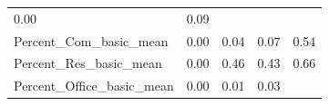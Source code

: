 \documentclass[]{article}
\begin{document}
\begin{longtable}[]{@{}lllll@{}}
\begin{minipage}[t]{0.09\columnwidth}
0.00\strut
\end{minipage} & \begin{minipage}[t]{0.11\columnwidth}\raggedright\strut
0.09\strut
\end{minipage}\tabularnewline
\begin{minipage}[t]{0.49\columnwidth}\raggedright\strut
Percent\_Com\_basic\_mean\strut
\end{minipage} & \begin{minipage}[t]{0.08\columnwidth}\raggedright\strut
0.00\strut
\end{minipage} & \begin{minipage}[t]{0.09\columnwidth}\raggedright\strut
0.04\strut
\end{minipage} & \begin{minipage}[t]{0.09\columnwidth}\raggedright\strut
0.07\strut
\end{minipage} & \begin{minipage}[t]{0.11\columnwidth}\raggedright\strut
0.54\strut
\end{minipage}\tabularnewline
\begin{minipage}[t]{0.49\columnwidth}\raggedright\strut
Percent\_Res\_basic\_mean\strut
\end{minipage} & \begin{minipage}[t]{0.08\columnwidth}\raggedright\strut
0.00\strut
\end{minipage} & \begin{minipage}[t]{0.09\columnwidth}\raggedright\strut
0.46\strut
\end{minipage} & \begin{minipage}[t]{0.09\columnwidth}\raggedright\strut
0.43\strut
\end{minipage} & \begin{minipage}[t]{0.11\columnwidth}\raggedright\strut
0.66\strut
\end{minipage}\tabularnewline
\begin{minipage}[t]{0.49\columnwidth}\raggedright\strut
Percent\_Office\_basic\_mean\strut
\end{minipage} & \begin{minipage}[t]{0.08\columnwidth}\raggedright\strut
0.00\strut
\end{minipage} & \begin{minipage}[t]{0.09\columnwidth}\raggedright\strut
0.01\strut
\end{minipage} & \begin{minipage}[t]{0.09\columnwidth}\raggedright\strut
0.03\strut
\end{minipage} & \begin{minipage}[t]{0.11\columnwidth}\raggedright\strut

\end{minipage}
\end{longtable}
\end{document}
